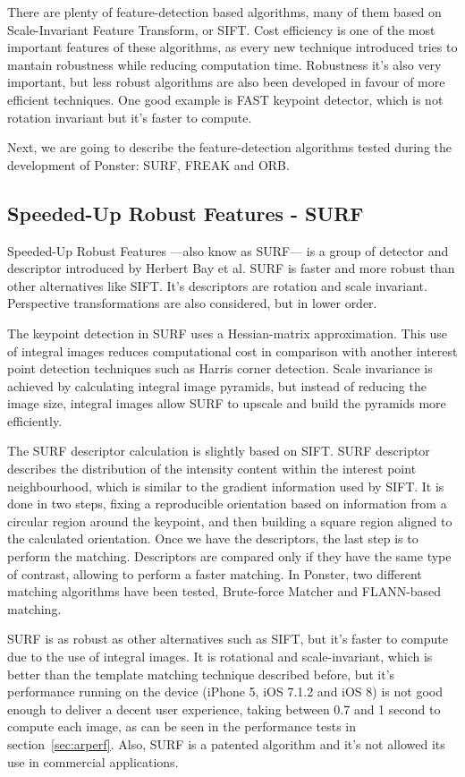 There are plenty of feature-detection based algorithms, many of them based on
Scale-Invariant Feature Transform, or SIFT. Cost efficiency is one of the most
important features of these algorithms, as every new technique introduced tries to
mantain robustness while reducing computation time. Robustness it's also very
important, but less robust algorithms are also been developed in favour of more
efficient techniques. One good example is FAST\cite{6126544} keypoint detector, which is
not rotation invariant but it's faster to compute.

Next, we are going to describe the feature-detection algorithms tested during the
development of Ponster: SURF, FREAK and ORB.

\subsection{Speeded-Up Robust Features - SURF}
Speeded-Up Robust Features ---also know as SURF--- is a group of detector and descriptor
introduced by Herbert Bay et al. SURF is faster and more robust than other
alternatives like SIFT\cite{Bay:2008:SRF:1370312.1370556}. It's descriptors are rotation and scale invariant.
Perspective transformations are also considered, but in lower order. 

The keypoint detection in SURF uses a Hessian-matrix approximation. This use of
integral images reduces computational cost in comparison with another interest point
detection techniques such as Harris corner detection. Scale invariance is achieved
by calculating integral image pyramids, but instead of reducing the image size,
integral images allow SURF to upscale and build the pyramids more efficiently. 

The SURF descriptor calculation is slightly based on SIFT. SURF descriptor describes
the distribution of the intensity content within the interest point neighbourhood,
which is similar to the gradient information used by SIFT. It is done in two steps,
fixing a reproducible orientation based on information from a circular region around
the keypoint, and then building a square region aligned to the calculated
orientation. Once we have the descriptors, the last step is to perform the
matching. Descriptors are compared only if they have the same type of contrast,
allowing to perform a faster matching. In Ponster, two different matching algorithms
have been tested, Brute-force Matcher and FLANN-based matching.

SURF is as robust as other alternatives such as SIFT, but it's faster to compute due
to the use of integral images. It is rotational and scale-invariant, which is better
than the template matching technique described before, but it's performance running
on the device (iPhone 5, iOS 7.1.2 and iOS 8) is not good enough to deliver a decent user
experience, taking between 0.7 and 1 second to compute each image, as can be
seen in the performance tests in section~\ref{sec:arperf}. Also, SURF is a
patented algorithm and it's not allowed its use in commercial applications. 

